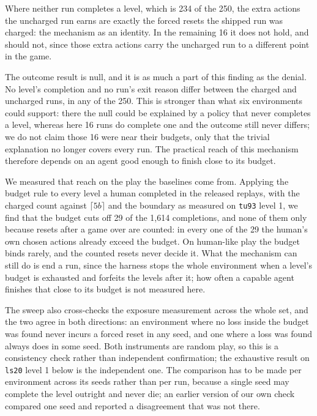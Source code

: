 \documentclass[11pt]{article}
\newcommand{\code}[1]{\texttt{#1}}
\begin{document}
Where neither run completes a level, which is 234 of the 250, the extra actions
the uncharged run earns are exactly the forced resets the shipped run was
charged: the mechanism as an identity. In the remaining 16 it does not
hold, and should not, since those extra actions carry the uncharged run to a
different point in the game.

The outcome result is null, and it is as much a part of this finding as the
denial. No level's completion and no run's exit reason differ between the
charged and uncharged runs, in any of the 250. This is stronger than what six
environments could support: there the null could be explained by a policy that
never completes a level, whereas here 16 runs do complete one and the
outcome still never differs; we do not claim those 16 were near their
budgets, only that the trivial explanation no longer covers every run. The practical reach of this mechanism therefore
depends on an agent good enough to finish close to its budget.

We measured that reach on the play the baselines come from. Applying the
budget rule to every level a human completed in the released replays, with the
charged count against $\lceil 5b \rceil$ and the boundary as measured on
\code{tu93} level 1, we find that the budget cuts off 29 of the 1,614 completions, and
none of them only because resets after a game over are counted: in every one
of the 29 the human's own chosen actions already exceed the budget. On
human-like play the budget binds rarely, and the counted resets never decide
it. What the mechanism can still do is end a run, since the harness stops the
whole environment when a level's budget is exhausted and forfeits the levels
after it; how often a capable agent finishes that close to its budget is not
measured here.

The sweep also cross-checks the exposure measurement across the whole set, and
the two agree in both directions: an environment where no loss inside the budget was
found never incurs a forced reset in any seed, and one where a loss was found
always does in some seed. Both instruments are random play, so this is a
consistency check rather than independent confirmation; the exhaustive result
on \code{ls20} level 1 below is the independent one. The comparison has to be made per environment across
its seeds rather than per run, because a single seed may complete the level
outright and never die; an earlier version of our own check compared one seed
and reported a disagreement that was not there.
\end{document}
